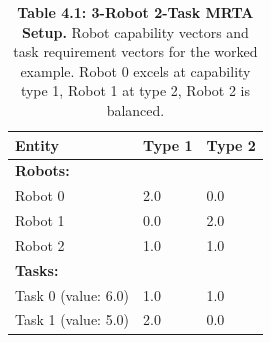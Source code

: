 \begin{table}[H]
\centering
\caption{\textbf{Table 4.1: 3-Robot 2-Task MRTA Setup.} Robot capability vectors and task requirement vectors for the worked example. Robot 0 excels at capability type 1, Robot 1 at type 2, Robot 2 is balanced.}
\label{tab:4-1}
\small
\begin{tabular}{lll}
\toprule
\textbf{Entity} & \textbf{Type 1} & \textbf{Type 2} \\
\midrule
\textbf{Robots:} & & \\
\rowcolor{gray!15}
Robot 0 & 2.0 & 0.0 \\
Robot 1 & 0.0 & 2.0 \\
\rowcolor{gray!15}
Robot 2 & 1.0 & 1.0 \\
\midrule
\textbf{Tasks:} & & \\
\rowcolor{gray!15}
Task 0 (value: 6.0) & 1.0 & 1.0 \\
Task 1 (value: 5.0) & 2.0 & 0.0 \\
\bottomrule
\end{tabular}
\end{table}
